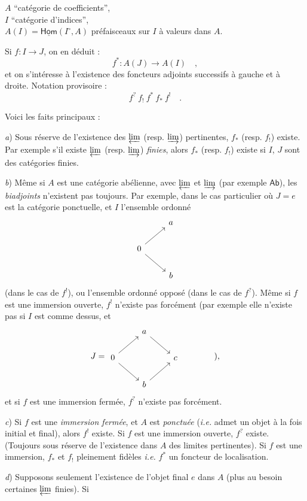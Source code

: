 \documentclass[11pt]{article}
\newcommand{\printedpage}[1]{\marginpar{\footnotesize p.~#1}}
\newcommand{\uHom}{\underline{\mathsf{Hom}}}
\newcommand{\Ab}{\mathsf{Ab}}
\begin{document}
$A$ “catégorie de coefficients”,\\
$I$ “catégorie d'indices”,\\
$A(I)=\uHom(I^{\circ},A)$ préfaisceaux sur $I$ à valeurs dans $A$.

Si $f : I \to J$, on en déduit :
\[
f^{*} : A(J) \to A(I) \quad ,
\]
et on s'intéresse à l'existence des foncteurs adjoints successifs à gauche et à droite. Notation provisoire :
\[
f^{?}\ f_{!}\ f^{*}\ f_{*}\ f^{!} \quad .
\]

Voici les faits principaux :

\textit{a}) Sous réserve de l'existence des $\varprojlim$ (resp. $\varinjlim$) pertinentes, $f_{*}$ (resp. $f_{!}$) existe. Par exemple s'il existe $\varprojlim$ (resp. $\varinjlim$) \textit{finies}, alors $f_{*}$ (resp. $f_{!}$) existe si $I$, $J$ sont des catégories finies.

\textit{b}) Même si $A$ est une catégorie abélienne, avec $\varprojlim$ et $\varinjlim$ (par exemple $\Ab$), les \textit{biadjoints} n'existent pas toujours. Par exemple, dans le cas particulier où $J=e$ est la catégorie ponctuelle, et $I$ l'ensemble ordonné
\[
\begin{tikzcd}
 & a \\
0 \arrow[ur] \arrow[dr] & \\
 & b
\end{tikzcd}
\]
(dans le cas de $f^{!}$), ou l'ensemble ordonné opposé (dans le cas de $f^{?}$). Même si $f$ est une immersion ouverte, $f^{!}$ n'existe pas forcément (par exemple elle n'existe pas si $I$ est comme dessus, et
\[
J=\begin{tikzcd}
 & a \arrow[dr] & \\
0 \arrow[ur] \arrow[dr] & & c \\
 & b \arrow[ur] &
\end{tikzcd}
\qquad\qquad \text{),}
\]
et si $f$ est une immersion fermée, $f^{?}$ n'existe pas forcément.

\textit{c}) Si $f$ est une \textit{immersion fermée}, et $A$ est \textit{ponctuée} (\textit{i.e.} admet un objet à la fois initial et final), alors $f^{!}$ existe. Si $f$ est une immersion ouverte, $f^{?}$ existe. (Toujours sous réserve
\printedpage{2}
de l'existence dans $A$ des limites pertinentes). Si $f$ est une immersion, $f_{*}$ et $f_{!}$ pleinement fidèles \textit{i.e.} $f^{*}$ un foncteur de localisation.

\textit{d}) Supposons seulement l'existence de l'objet final $e$ dans $A$ (plus au besoin certaines $\varprojlim$ finies). Si
\end{document}

